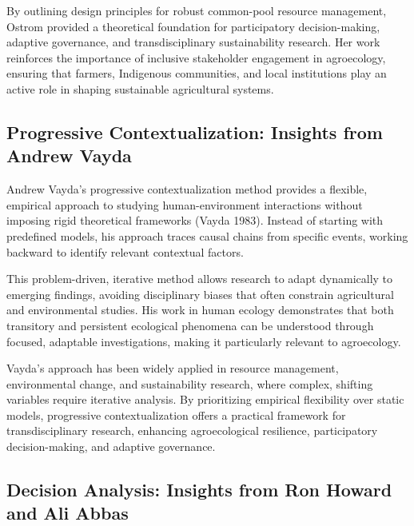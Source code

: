 \documentclass[
]{article}
\begin{document}
By outlining design principles for robust common-pool resource
management, Ostrom provided a theoretical foundation for participatory
decision-making, adaptive governance, and transdisciplinary
sustainability research. Her work reinforces the importance of inclusive
stakeholder engagement in agroecology, ensuring that farmers, Indigenous
communities, and local institutions play an active role in shaping
sustainable agricultural systems.

\hypertarget{progressive-contextualization-insights-from-andrew-vayda}{%
\subsection*{Progressive Contextualization: Insights from Andrew
Vayda}\label{progressive-contextualization-insights-from-andrew-vayda}}

Andrew Vayda's progressive contextualization method provides a flexible,
empirical approach to studying human-environment interactions without
imposing rigid theoretical frameworks (Vayda 1983). Instead of starting
with predefined models, his approach traces causal chains from specific
events, working backward to identify relevant contextual factors.

This problem-driven, iterative method allows research to adapt
dynamically to emerging findings, avoiding disciplinary biases that
often constrain agricultural and environmental studies. His work in
human ecology demonstrates that both transitory and persistent
ecological phenomena can be understood through focused, adaptable
investigations, making it particularly relevant to agroecology.

Vayda's approach has been widely applied in resource management,
environmental change, and sustainability research, where complex,
shifting variables require iterative analysis. By prioritizing empirical
flexibility over static models, progressive contextualization offers a
practical framework for transdisciplinary research, enhancing
agroecological resilience, participatory decision-making, and adaptive
governance.

\hypertarget{decision-analysis-insights-from-ron-howard-and-ali-abbas}{%
\subsection*{Decision Analysis: Insights from Ron Howard and Ali
Abbas}\label{decision-analysis-insights-from-ron-howard-and-ali-abbas}}
\end{document}
